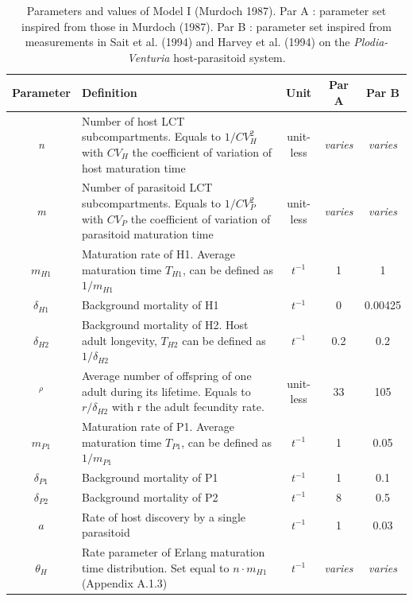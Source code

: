 \documentclass[12pt,a4paper,onecolumn]{article}
\begin{document}
\begin{table}[htb]
\centering
\footnotesize
\begin{tabularx}{\linewidth}{c >{\raggedright\arraybackslash}X c c c}
\toprule
Parameter & Definition & Unit & Par A & Par B \\

\midrule
\textit{n} & Number of host LCT subcompartments. Equals to $1/CV_H^2$ with $CV_H$ the
coefficient of variation of host maturation time & unit-less & \textit{varies} & \textit{varies} \\

\textit{m} & Number of parasitoid LCT subcompartments. Equals to $1/CV_P^2$ with $CV_P$ the
coefficient of variation of parasitoid maturation time & unit-less & \textit{varies} & \textit{varies} \\

$m_{H1}$ & Maturation rate of H1. Average maturation time  $T_{H1}$, can be defined as $1/m_{H1}$ & $t^{-1}$ & 1  & 1 \\

$\delta_{H1}$ & Background mortality of H1 & $t^{-1}$ & 0 & 0.00425 \\
$\delta_{H2}$ & Background mortality of H2. Host adult longevity, $T_{H2}$ can be defined as $1/\delta_{H2}$ & $t^{-1}$ &  0.2 & 0.2  \\
$^\rho$ & Average number of offspring of one adult during its lifetime. Equals to $r/\delta_{H2}$ with r the adult fecundity rate. & unit-less & 33 & 105 \\

$m_{P1}$ & Maturation rate of P1. Average maturation time  $T_{P1}$, can be defined as $1/m_{P1}$ & $t^{-1}$ & 1 & 0.05 \\
$\delta_{P1}$ & Background mortality of P1 & $t^{-1}$ & 1 & 0.1  \\
$\delta_{P2}$ & Background mortality of P2 & $t^{-1}$ & 8 & 0.5  \\
$a$ & Rate of host discovery by a single parasitoid & $t^{-1}$ & 1 & 0.03  \\

$\theta_H$ & Rate parameter of Erlang maturation time distribution. Set equal to $n \cdot m_{H1}$ (Appendix A.1.3) & $t^{-1}$ & \textit{varies}  & \textit{varies}   \\

\bottomrule
\end{tabularx}
\caption{Parameters and values of Model I (Murdoch 1987). Par A : parameter set inspired from those in Murdoch (1987). Par B : parameter set inspired from measurements in Sait et al. (1994) and Harvey et al. (1994) on the \textit{Plodia-Venturia} host-parasitoid system.}
\end{table}
\end{document}
